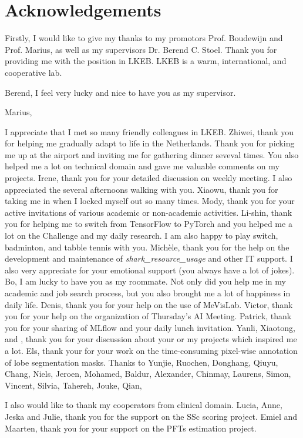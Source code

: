 \chapter{Acknowledgements}
\label{ack}

Firstly, I would like to give my thanks to my promotors Prof. Boudewijn and Prof. Marius, as well as my supervisors Dr. Berend C. Stoel. Thank you for providing me with the position in LKEB. LKEB is a warm, international, and cooperative lab.

Berend, I feel very lucky and nice to have you as my supervisor. 

Marius,

I appreciate that I met so many friendly colleagues in LKEB. 
Zhiwei, thank you for helping me gradually adapt to life in the Netherlands. Thank you for picking me up at the airport and inviting me for gathering dinner seveval times. You also helped me a lot on technical domain and gave me valuable comments on my projects.
Irene, thank you for your detailed discussion on weekly meeting. I also appreciated the several afternoons walking with you.
Xiaowu, thank you for taking me in when I locked myself out so many times. 
Mody, thank you for your active invitations of various academic or non-academic activities.
Li-shin, thank you for helping me to switch from TensorFlow to PyTorch and you helped me a lot on the Challenge and my daily research. I am also happy to play switch, badminton, and tabble tennis with you.
Michèle, thank you for the help on the development and maintenance of \textit{shark\_resource\_usage} and other IT support. I also very appreciate for your emotional support (you always have a lot of jokes). 
Bo, I am lucky to have you as my roommate. Not only did you help me in my academic and job search process, but you also brought me a lot of happiness in daily life. 
Denis, thank you for your help on the use of MeVisLab. 
Victor, thank you for your help on the organization of Thursday's AI Meeting. 
Patrick, thank you for your sharing of MLflow and your daily lunch invitation. 
Yanli, Xiaotong, and , thank you for your discussion about your or my projects which inspired me a lot. 
Els, thank your for your work on the time-consuming pixel-wise annotation of lobe segmentation masks.
Thanks to Yunjie, Ruochen, Donghang, Qiuyu, Chang, Niels, Jeroen, Mohamed, Baldur, Alexander, Chinmay, Laurens, Simon, Vincent, Silvia, Tahereh, Jouke, Qian, 

I also would like to thank my cooperators from clinical domain. Lucia, Anne, Jeska and Julie, thank you for the support on the SSc scoring project. Emiel and Maarten, thank you for your support on the PFTs estimation project.

